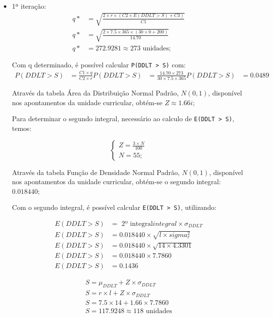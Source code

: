 \begin{itemize}
	\item 1ª iteração:
\begin{align*}	
	q*&=\sqrt{\frac{2 \times r \times (C2 \times E(DDLT > S) + C3)}{C1}}\\
	q*&=\sqrt{\frac{2 \times 7.5 \times 365 \times (30 \times 0 + 200)}{14.70}}\\
	q*&=272.9281 \approx 273 \text{ unidades};
	\label{}
\end{align*}


	Com q determinado, é possível calcular \texttt{P(DDLT > S)} com:
	\begin{align*}	
	P(DDLT > S)&=\frac{C1 \times q}{C2 \times r}
	P(DDLT > S)&=\frac{14.70 \times 273}{30 \times 7.5 \times 365}
	P(DDLT > S)&=0.0489
		\label{}
	\end{align*}


	Através da tabela Área da Distribuição Normal Padrão, $N(0,1)$, disponível
	nos apontamentos da unidade curricular, obtém-se $Z \approx 1.66i$;
	
	Para determinar o segundo integral, necessário ao calculo de \texttt{E(DDLT
	> S)}, temos:


$$\begin{cases}
	Z=\frac{3 \times N}{100}\\
	N=55;
\end{cases}$$

	Através da tabela Função de Densidade Normal Padrão, $N(0,1)$, disponível nos
	apontamentos da unidade curricular, obtém-se o segundo integral: $0.018440$;

	Com o segundo integral, é possível calcular \texttt{E(DDLT > S)}, utilizando:

	\begin{align*}	
	E(DDLT > S) &= \text{ 2º integral} integral \times \sigma_{DDLT}\\
	E(DDLT > S) &= 0.018440 \times \sqrt{ l \times sigma_r^2}\\
	E(DDLT > S) &= 0.018440 \times \sqrt{14 \times 4.3301}\\
	E(DDLT > S) &= 0.018440 \times 7.7860\\
	E(DDLT > S) &= 0.1436
	\end{align*}


	\begin{align*}	
	S = \mu_{DDLT} + Z \times \sigma_{DDLT}\\
	S = r \times l + Z \times \sigma_{DDLT}\\
	S = 7.5 \times 14 + 1.66 \times 7.7860\\
	S = 117.9248 \approx 118 \text{ unidades}
	\end{align*}


\end{itemize}
